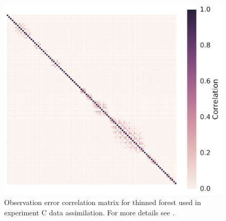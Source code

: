 \documentclass[draft,jgrga]{agutexSI}
\begin{document}
\begin{figure}[ht]
 \noindent\includegraphics[width=30pc]{rmat_eastc.pdf}
    \caption{Observation error correlation matrix for thinned forest used in experiment C data assimilation. For more details see \citet{Pinnington2016299}.} \label{fig:rmat_ut}
\end{figure}
\end{document}
